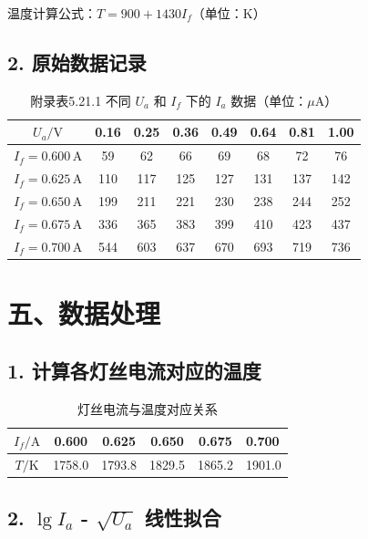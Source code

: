 \documentclass[UTF8,a4paper,zihao=-4]{ctexart}
\begin{document}
温度计算公式：$T = 900 + 1430 I_f$（单位：K）

\subsection*{2. 原始数据记录}

\begin{table}[H]
    \centering
    \caption{附录表5.21.1 不同 $U_a$ 和 $I_f$ 下的 $I_a$ 数据（单位：$\mu\text{A}$）}
    \renewcommand{\arraystretch}{1.3}
    \begin{tabular}{c|ccccccc}
        \hline
        $U_a/\text{V}$ & 0.16 & 0.25 & 0.36 & 0.49 & 0.64 & 0.81 & 1.00 \\
        \hline
        $I_f = 0.600\,\text{A}$ & 59 & 62 & 66 & 69 & 68 & 72 & 76 \\
        $I_f = 0.625\,\text{A}$ & 110 & 117 & 125 & 127 & 131 & 137 & 142 \\
        $I_f = 0.650\,\text{A}$ & 199 & 211 & 221 & 230 & 238 & 244 & 252 \\
        $I_f = 0.675\,\text{A}$ & 336 & 365 & 383 & 399 & 410 & 423 & 437 \\
        $I_f = 0.700\,\text{A}$ & 544 & 603 & 637 & 670 & 693 & 719 & 736 \\
        \hline
    \end{tabular}
\end{table}

\section*{五、数据处理}

\subsection*{1. 计算各灯丝电流对应的温度}

\begin{table}[H]
    \centering
    \caption{灯丝电流与温度对应关系}
    \renewcommand{\arraystretch}{1.3}
    \begin{tabular}{ccccc}
        \hline
        $I_f/\text{A}$ & 0.600 & 0.625 & 0.650 & 0.675 & 0.700 \\
        \hline
        $T/\text{K}$ & 1758.0 & 1793.8 & 1829.5 & 1865.2 & 1901.0 \\
        \hline
    \end{tabular}
\end{table}

\subsection*{2. $\lg I_a$ - $\sqrt{U_a}$ 线性拟合}
\end{document}
